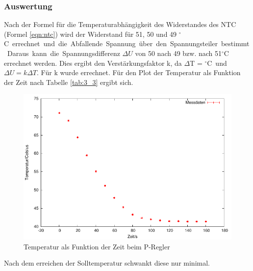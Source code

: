 \documentclass[12pt,a4paper]{article}
\begin{document}
\subsubsection*{Auswertung}
Nach der Formel für die Temperaturabhängigkeit des Widerstandes des NTC (Formel \ref{eqn:ntc}) wird der Widerstand für 51, 50 und 49 \unit[]{$^{\circ}$C} errechnet und die Abfallende Spannung über den Spannungsteiler bestimmt. Daraus kann die Spannungsdifferenz $\Delta U$ von 50 nach 49 bzw. nach 51$^{\circ}$C errechnet werden. Dies ergibt den Verstärkungsfaktor k, da $\Delta$T = \unit[1]{$^\circ$C} und $\Delta U = k \Delta T$. Für k wurde  errechnet.
Für den Plot der Temperatur als Funktion der Zeit nach Tabelle \ref{tab:3_3} ergibt sich.
\begin{figure}[H]
  \centering
    \includegraphics[scale = 1]{3_3.pdf}
  	\caption[Temperatur als Funktion der Zeit beim P-Regler]{Temperatur als Funktion der Zeit beim P-Regler}
  \label{fig:P-Regler_Plot_3_3}
\end{figure}
Nach dem erreichen der Solltemperatur schwankt diese nur minimal.
\end{document}
